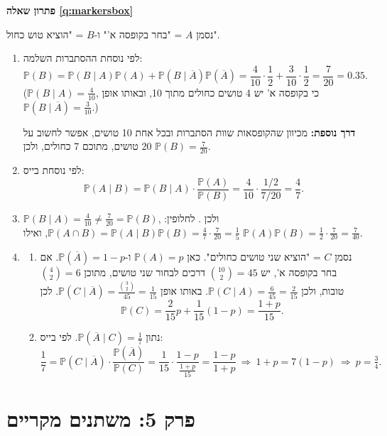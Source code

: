 \documentclass[11pt,a4paper]{report}
\newcommand{\comp}[1]{\overline{#1}}
\newcommand{\PP}{\mathbb{P}}
\newenvironment{solution}[1]{\par\bigskip\noindent
  {\sffamily\bfseries\color{thmc}פתרון שאלה \ref{q:#1}}\par\nopagebreak\smallskip}%
  {\par\medskip\noindent{\color{exc!50}\rule{\linewidth}{0.4pt}}\par}
\newcommand{\ans}[1]{\boxed{#1}}
\begin{document}
\begin{solution}{markersbox}
נסמן $A$ = "בחר בקופסה א'" ו-$B$ = "הוציא טוש כחול".
\begin{enumerate}[label=(\alph*)]
  \item לפי נוסחת ההסתברות השלמה:
  \[
    \PP(B)=\PP(B\mid A)\PP(A)+\PP(B\mid\comp A)\PP(\comp A)=\frac4{10}\cdot\frac12+\frac3{10}\cdot\frac12=\frac7{20}=\ans{0.35}.
  \]
  ($\PP(B\mid A)=\frac4{10}$, כי בקופסה א' יש 4 טושים כחולים מתוך 10, ובאותו אופן $\PP(B\mid\comp A)=\frac3{10}$.)

  \textbf{דרך נוספת:} מכיוון שהקופסאות שוות הסתברות ובכל אחת 10 טושים, אפשר לחשוב על 20 טושים, מתוכם 7 כחולים, ולכן $\PP(B)=\frac7{20}$.
  \item לפי נוסחת בייס:
  \[
    \PP(A\mid B)=\PP(B\mid A)\cdot\frac{\PP(A)}{\PP(B)}=\frac4{10}\cdot\frac{1/2}{7/20}=\ans{\frac47}.
  \]
  \item $\PP(B\mid A)=\frac4{10}\neq\frac7{20}=\PP(B)$, ולכן \ans{\text{המאורעות $A,B$ תלויים}}.
  לחלופין: $\PP(A\cap B)=\PP(A\mid B)\PP(B)=\frac47\cdot\frac7{20}=\frac15$, ואילו $\PP(A)\PP(B)=\frac12\cdot\frac7{20}=\frac7{40}$.
  \item
  \begin{enumerate}[label=(\arabic*)]
    \item נסמן $C$ = "הוציא שני טושים כחולים". כאן $\PP(A)=p$ ו-$\PP(\comp A)=1-p$. אם בחר בקופסה א', יש $\binom{10}2=45$ דרכים לבחור שני טושים, מתוכן $\binom42=6$ טובות, ולכן $\PP(C\mid A)=\frac6{45}=\frac2{15}$. באותו אופן $\PP(C\mid\comp A)=\frac{\binom32}{45}=\frac1{15}$. לכן
    \[
      \PP(C)=\frac2{15}p+\frac1{15}(1-p)=\ans{\frac{1+p}{15}}.
    \]
    \item נתון $\PP(\comp A\mid C)=\frac17$. לפי בייס:
    \[
      \frac17=\PP(C\mid\comp A)\cdot\frac{\PP(\comp A)}{\PP(C)}=\frac1{15}\cdot\frac{1-p}{\frac{1+p}{15}}=\frac{1-p}{1+p}
      \ \Longrightarrow\ 1+p=7(1-p)\ \Longrightarrow\ \ans{p=\tfrac34}.
    \]
  \end{enumerate}
\end{enumerate}
\end{solution}

\section*{פרק 5: משתנים מקריים}
\end{document}
